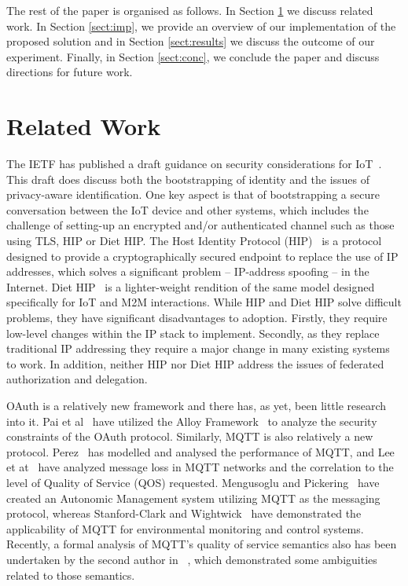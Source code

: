 \documentclass{IEEEtran}
\begin{document}
The rest of the paper is organised as follows.  In Section \ref{sect:related} we discuss related work.  In Section \ref{sect:imp}, we provide an overview of our implementation of the proposed solution and in Section \ref{sect:results} we discuss the outcome of our experiment. Finally, in Section \ref{sect:conc}, we conclude the paper and discuss directions for future work.

\section{Related Work}\label{sect:related}
The IETF has published a draft guidance on security considerations for IoT~\cite{draft-garcia}. This draft
does discuss both the bootstrapping of identity and the issues of privacy-aware identification.
One key aspect is that of bootstrapping a secure conversation between the IoT device and other 
systems, which includes the challenge of setting-up an encrypted and/or authenticated channel
such as those using TLS, HIP or Diet HIP. The Host Identity Protocol (HIP)~\cite{moskowitz2012host} is a protocol designed 
to provide a cryptographically secured endpoint to replace the use of IP addresses, which solves
a significant problem -- IP-address spoofing -- in the Internet. Diet HIP~\cite{moskowitz2012hip} is a lighter-weight rendition
of the same model designed specifically for IoT and M2M interactions. While HIP and Diet HIP
solve difficult problems, they have significant disadvantages to adoption. Firstly, they require
low-level changes within the IP stack to implement. Secondly, as they replace traditional IP 
addressing they require a major change in many existing systems to work.
In addition, neither HIP nor Diet HIP address the issues of federated authorization and delegation.

OAuth is a relatively new framework and there has, as yet, been little research into it. 
Pai et al~\cite{pai2011formal}
have utilized the Alloy Framework~\cite{jackson2004alloy} 
to analyze the security constraints of the OAuth protocol. 
Similarly, MQTT is also relatively a new protocol. Perez~\cite{perez2005mqtt} has modelled and analysed the performance of MQTT, and Lee et at~\cite{lee2013correlation}
have analyzed message loss in MQTT networks and the correlation to the level of Quality of Service (QOS) requested.
Mengusoglu and Pickering~\cite{mengusoglu2007automated} have created 
an Autonomic Management system utilizing MQTT as the messaging protocol, whereas Stanford-Clark and Wightwick~\cite{stanford2010application} have demonstrated the applicability of MQTT for environmental monitoring and control systems. 
Recently, a formal analysis of MQTT's quality of service semantics also has been undertaken by the second author in ~\cite{aziz-mqtt}, which demonstrated some ambiguities related to those semantics.
\end{document}

